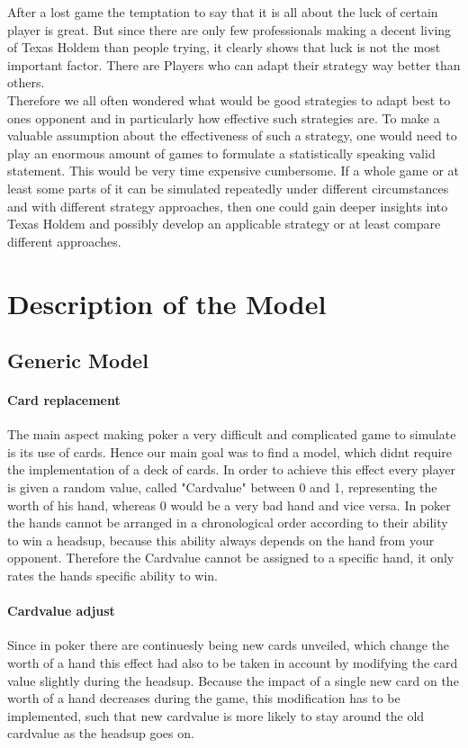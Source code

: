 \documentclass[11pt]{article}
\begin{document}
After a lost game the temptation to say that it is all about the luck of certain player is great. But since there are only few professionals making a decent living of Texas Holdem than people trying, it clearly shows that luck is not the most important factor. There are Players who can adapt their strategy way better than others.
\\
Therefore we all often wondered what would be good strategies to adapt best to ones opponent and in particularly how effective such strategies are. To make a valuable assumption about the effectiveness of such a strategy, one would need to play an enormous amount of games to formulate a statistically speaking valid statement. This would be very time expensive cumbersome. If a whole game or at least some parts of it can be simulated repeatedly under different circumstances and with different strategy approaches, then one could gain deeper insights into Texas Holdem and possibly develop an applicable strategy or at least compare different approaches.

\section{Description of the Model}



\subsection{Generic Model}

\paragraph{Card replacement}
The main aspect making poker a very difficult and complicated game to simulate is its use of cards. Hence our main goal was to find a model, which didnt require the implementation of a deck of cards. In order to achieve this effect every player is given a random value, called "Cardvalue" between 0 and 1, representing the worth of his hand, whereas 0 would be a very bad hand and vice versa. In poker the hands cannot be arranged in a chronological order according to their ability to win a headsup, because this ability always depends on the hand from your opponent. Therefore the Cardvalue cannot be assigned to a specific hand, it only rates the hands specific ability to win.

\paragraph{Cardvalue adjust}
Since in poker there are continuesly being new cards unveiled, which change the worth of a hand this effect had also to be taken in account by modifying the card value slightly during the headsup. Because the impact of a single new card on the worth of a hand decreases during the game, this modification has to be implemented, such that new cardvalue is more likely to stay around the old cardvalue as the headsup goes on.
\end{document}

